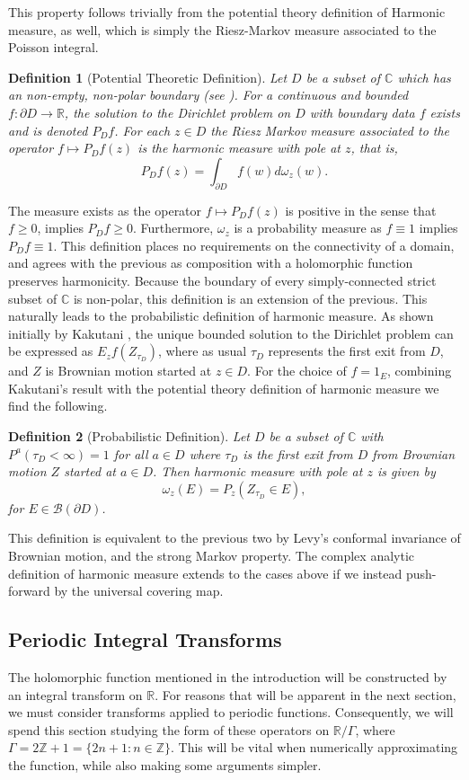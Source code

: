 \documentclass[a4paper, oneside, 12pt]{amsart}
\newtheorem{definition}{Definition}
\newcommand{\mc}{\mathcal}
\newcommand{\C}{\mathbb{C}}
\newcommand{\Z}{\mathbb{Z}}
\newcommand{\R}{\mathbb{R}}
\begin{document}
This property follows trivially from the potential theory
definition of Harmonic measure, as well, which is simply the Riesz-Markov measure associated to the Poisson integral.
\begin{definition}[Potential Theoretic Definition]
    Let $D$ be a subset of $\C$ which has an non-empty, non-polar boundary (see \cite{ransford}). For a continuous and bounded $f:\partial D \to \R$, the
    solution to the Dirichlet problem on $D$ with boundary data $f$ exists and is denoted $P_D f$. For each $z\in D$ the Riesz Markov measure associated to the operator
    $f\mapsto P_Df(z)$ is the harmonic measure with pole at $z$, that is,
    $$
	    P_Df(z) = \int_{\partial D}f(w) d\omega_z(w).
    $$
\end{definition}
The measure exists as the operator $f\mapsto P_D f(z)$ is positive in the sense that $f\geq0$, implies $P_D f\geq0$. Furthermore, $\omega_z$ is a probability measure as $f\equiv1$ implies $P_D f \equiv 1$.
This definition places no requirements on the
connectivity of a domain, and agrees with the previous as 
composition with a holomorphic function preserves harmonicity. Because the boundary of 
every simply-connected strict subset of $\C$ is non-polar, this definition is an extension of the 
previous. 
This naturally leads to the probabilistic
definition of harmonic measure.  As shown initially by Kakutani \cite{Kakutani}, the unique bounded solution to the
Dirichlet 
problem can be expressed as $E_zf(Z_{\tau_D})$, where as usual $\tau_D$ represents the first 
exit from $D$, and $Z$ is Brownian motion started at $z\in D$. For the choice of $f=1_E$, combining
Kakutani's result with the potential theory definition of harmonic measure we find the following.
\begin{definition}[Probabilistic Definition]
    Let $D$ be a subset of $\C$ with $P^a(\tau_D <\infty) = 1$ for all $a\in D$ where $\tau_D$ is the first exit from $D$ from Brownian motion $Z$ started at $a\in D$. 
    Then harmonic measure with pole at $z$ is given by
        $$
	    \omega_z(E) = P_z(Z_{\tau_D}\in E),
        $$
for $E\in \mc{B}(\partial D)$.
\end{definition}
This definition is equivalent to the previous two by Levy's conformal invariance of Brownian motion,
and the strong Markov property. The complex analytic definition of harmonic measure extends to the 
cases above if we instead push-forward by the universal covering map.

\subsection{Periodic Integral Transforms}
The holomorphic function mentioned in the introduction will be constructed by an integral transform
on $\R$. For reasons that will be apparent in the next section, we must consider
transforms applied to periodic functions. Consequently, we will spend this section studying 
the form of these operators on $\R/ \Gamma$, where $\Gamma = 2\Z+1=\{2n+1:n\in\Z\}$. This will be vital when numerically
approximating the function, while also making some arguments simpler.\\
\end{document}
